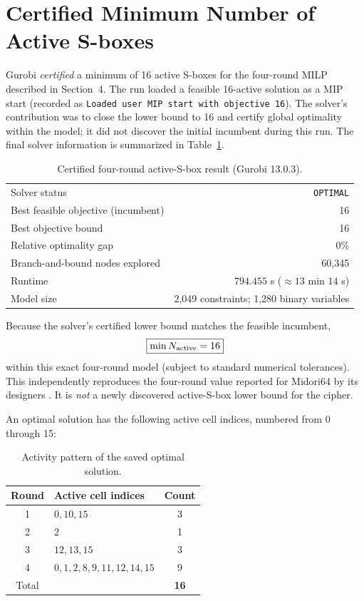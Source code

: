 \documentclass[11pt,a4paper]{article}
\begin{document}
\section{Certified Minimum Number of Active S-boxes}
Gurobi \emph{certified} a minimum of 16 active S-boxes for the
four-round MILP described in Section~4. The run loaded a feasible 16-active
solution as a MIP start (recorded as \texttt{Loaded user MIP start with
objective 16}). The solver's contribution was to close the lower bound to
16 and certify global optimality within the model; it did not discover the
initial incumbent during this run. The final solver information is
summarized in Table~\ref{tab:active-res}.
\begin{table}[H]
 \centering
 \caption{Certified four-round active-S-box result (Gurobi 13.0.3).}\label{tab:active-res}
 \begin{tabular}{lr}
 \toprule
 Solver status & \texttt{OPTIMAL}\\
 Best feasible objective (incumbent) & 16\\
 Best objective bound & 16\\
 Relative optimality gap & $0\%$\\
 Branch-and-bound nodes explored & 60,345\\
 Runtime & $794.455$ s ($\approx13$ min $14$ s)\\
 Model size & 2,049 constraints; 1,280 binary variables\\
 \bottomrule
 \end{tabular}
\end{table}
Because the solver's certified lower bound matches the feasible incumbent,
\begin{equation}\label{eq:active-result}
 \boxed{\min N_{\rm active}=16}
\end{equation}
within this exact four-round model (subject to standard numerical tolerances).
This independently reproduces the four-round value reported for Midori64 by
its designers \cite{banik2015}. It is \emph{not} a newly discovered
active-S-box lower bound for the cipher.

An optimal solution has the following active cell indices, numbered from 0
through 15:
\begin{table}[H]
 \centering
 \caption{Activity pattern of the saved optimal solution.}
 \begin{tabular}{clc}
 \toprule
 Round & Active cell indices & Count\\
 \midrule
 1 & $0,10,15$ & 3\\
 2 & $2$ & 1\\
 3 & $12,13,15$ & 3\\
 4 & $0,1,2,8,9,11,12,14,15$ & 9\\
 \midrule
 Total & & \textbf{16}\\
 \bottomrule
 \end{tabular}
\end{table}
\end{document}
